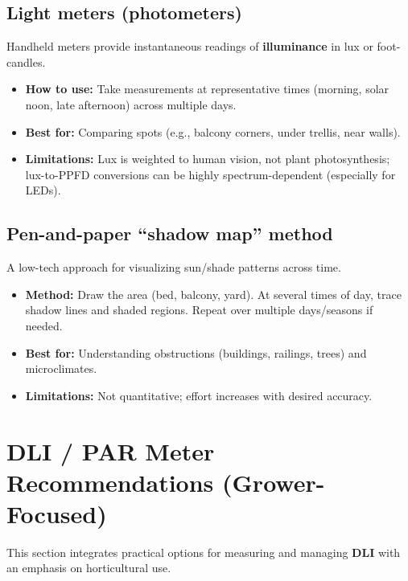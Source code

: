 \documentclass[11pt]{article}
\begin{document}
\subsection{Light meters (photometers)}
Handheld meters provide instantaneous readings of \textbf{illuminance} in lux or foot-candles.
\begin{itemize}
  \item \textbf{How to use:} Take measurements at representative times (morning, solar noon, late afternoon) across multiple days.
  \item \textbf{Best for:} Comparing spots (e.g., balcony corners, under trellis, near walls).
  \item \textbf{Limitations:} Lux is weighted to human vision, not plant photosynthesis; lux-to-PPFD conversions can be highly spectrum-dependent (especially for LEDs).
\end{itemize}

\subsection{Pen-and-paper ``shadow map'' method}
A low-tech approach for visualizing sun/shade patterns across time.
\begin{itemize}
  \item \textbf{Method:} Draw the area (bed, balcony, yard). At several times of day, trace shadow lines and shaded regions. Repeat over multiple days/seasons if needed.
  \item \textbf{Best for:} Understanding obstructions (buildings, railings, trees) and microclimates.
  \item \textbf{Limitations:} Not quantitative; effort increases with desired accuracy.
\end{itemize}

\section{DLI / PAR Meter Recommendations (Grower-Focused)}
This section integrates practical options for measuring and managing \textbf{DLI} with an emphasis on horticultural use.
\end{document}
